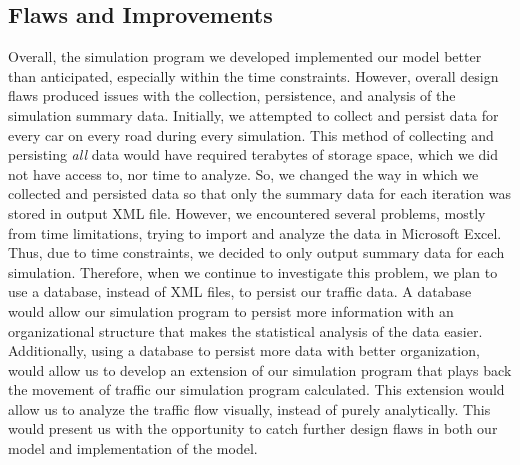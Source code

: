 \documentclass[letterpaper,12pt]{article}
\begin{document}
		\subsection{Flaws and Improvements}
			Overall, the simulation program we developed implemented our model better than anticipated, especially within the time constraints. However, overall design flaws produced issues with the collection, persistence, and analysis of the simulation summary data. Initially, we attempted to collect and persist data for every car on every road during every simulation. This method of collecting and persisting \emph{all} data would have required terabytes of storage space, which we did not have access to, nor time to analyze. So, we changed the way in which we collected and persisted data so that only the summary data for each iteration was stored in output XML file. However, we encountered several problems, mostly from time limitations, trying to import and analyze the data in Microsoft Excel. Thus, due to time constraints, we decided to only output summary data for each simulation. Therefore, when we continue to investigate this problem, we plan to use a database, instead of XML files, to persist our traffic data. A database would allow our simulation program to persist more information with an organizational structure that makes the statistical analysis of the data easier. Additionally, using a database to persist more data with better organization, would allow us to develop an extension of our simulation program that plays back the movement of traffic our simulation program calculated. This extension would allow us to analyze the traffic flow visually, instead of purely analytically. This would present us with the opportunity to catch further design flaws in both our model and implementation of the model.
\end{document}
